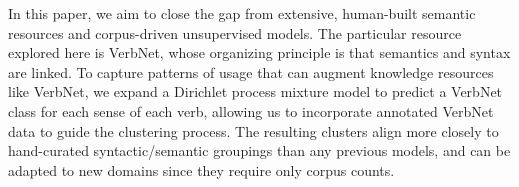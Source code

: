 In this paper, we aim to close the gap from extensive, human-built semantic resources and corpus-driven unsupervised models. The particular resource explored here is VerbNet, whose organizing principle is that semantics and syntax are linked. To capture patterns of usage that can augment knowledge resources like VerbNet, we expand a Dirichlet process mixture model to predict a VerbNet class for each sense of each verb, allowing us to incorporate annotated VerbNet data to guide the clustering process. The resulting clusters align more closely to hand-curated syntactic/semantic groupings than any previous models, and can be adapted to new domains since they require only corpus counts.
